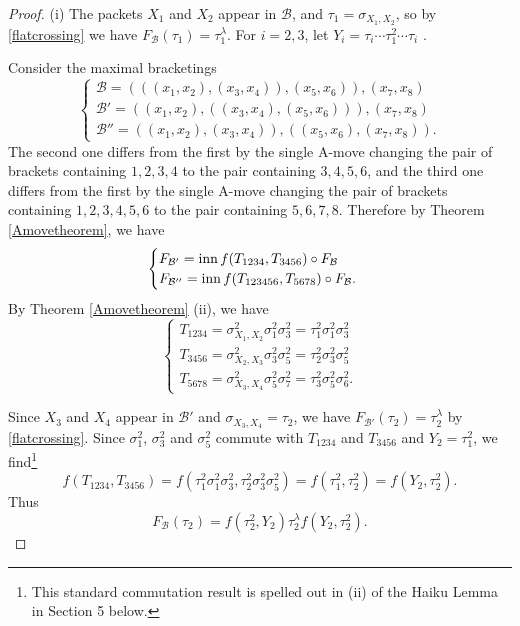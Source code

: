 \documentclass[a4paper,10pt,reqno]{amsart}
\begin{document}
\begin{proof} (i) The packets $X_1$ and $X_2$ appear in ${\mathcal{B}}$, 
and $\tau_1=\sigma_{X_1,X_2}$, so by \eqref{flatcrossing} we have
$F_{\mathcal{B}}(\tau_1)=\tau_1^\lambda$. For $i=2,3$, 
let $Y_i=\tau_i\cdots \tau_1^2\cdots \tau_i$ .


Consider the maximal bracketings
\begin{equation}\label{threebracketings}
\begin{cases}
{\mathcal{B}}=(((x_1,x_2),(x_3,x_4)),(x_5,x_6)),(x_7,x_8)\\
{\mathcal{B}'}=((x_1,x_2),((x_3,x_4),(x_5,x_6))),(x_7,x_8)\\
{\mathcal{B}''}=((x_1,x_2),(x_3,x_4)),((x_5,x_6),(x_7,x_8)).
\end{cases}
\end{equation}
The second one differs from the first by the single A-move changing the pair 
of brackets containing $1,2,3,4$ to the pair containing $3,4,5,6$, 
and the third one differs from the first by the single A-move changing
the pair of brackets containing $1,2,3,4,5,6$ to the pair containing
$5,6,7,8$.  Therefore by Theorem \ref{Amovetheorem}, we have
\begin{equation}\label{inns}
\begin{cases}
F_{\mathcal{B}'}={\rm inn}\,f(T_{1234},T_{3456})\circ F_{\mathcal{B}}\\
F_{\mathcal{B}''}={\rm inn}\,f(T_{123456},T_{5678})\circ F_{\mathcal{B}}.
\end{cases}
\end{equation}
By Theorem \ref{Amovetheorem} (ii), we have
\begin{equation}\label{tausigmas}
\begin{cases}
T_{1234}=\sigma_{X_1,X_2}^2\sigma_1^2\sigma_3^2=\tau_1^2\sigma_1^2\sigma_3^2\\
T_{3456}=\sigma_{X_2,X_3}^2\sigma_3^2\sigma_5^2=\tau_2^2\sigma_3^2\sigma_5^2\\
T_{5678}=\sigma_{X_3,X_4}^2\sigma_5^2\sigma_7^2=\tau_3^2\sigma_5^2\sigma_6^2.
\end{cases}
\end{equation}

Since $X_3$ and $X_4$ appear in ${\mathcal{B}'}$ and
$\sigma_{X_3,X_4}=\tau_2$, we have
$F_{\mathcal{B}'}(\tau_2)=\tau_2^\lambda$
by \eqref{flatcrossing}. 
Since $\sigma_1^2$, $\sigma_3^2$ and $\sigma_5^2$ commute with $T_{1234}$ and
$T_{3456}$ and $Y_2=\tau_1^2$, we find\footnote{This standard commutation
result is spelled out in (ii) of the Haiku Lemma in Section 5 below.}
$$f(T_{1234},T_{3456})=f(\tau_1^2\sigma_1^2\sigma_3^2,\tau_2^2
\sigma_3^2\sigma_5^2)=f(\tau_1^2,\tau_2^2)=f(Y_2,\tau_2^2).$$
Thus 
$$F_{\mathcal{B}}(\tau_2)=f(\tau_2^2,Y_2)\tau_2^\lambda f(Y_2,\tau_2^2).$$


\end{proof}
\end{document}
